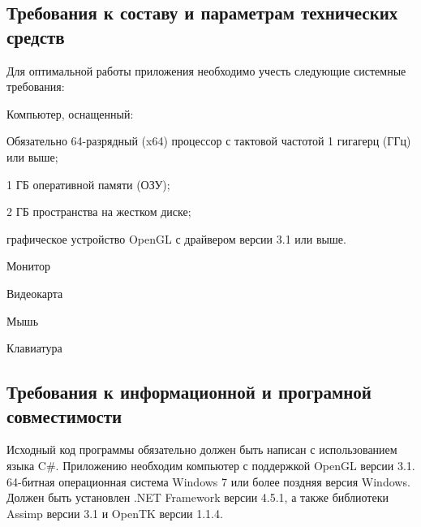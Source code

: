 \subsection{Требования к составу и параметрам технических средств}
Для оптимальной работы приложения необходимо учесть следующие системные требования:
\begin{my_enumerate}
\item Компьютер, оснащенный:
    \begin{my_enumerate}
    \item Обязательно 64-разрядный (x64) процессор с тактовой частотой 1 гигагерц (ГГц) или выше;
    \item 1 ГБ оперативной памяти (ОЗУ);
    \item 2 ГБ пространства на жестком диске;
    \item графическое устройство OpenGL с драйвером версии 3.1 или выше.
    \end{my_enumerate}
\item Монитор
\item Видеокарта
\item Мышь
\item Клавиатура
\end{my_enumerate}


\subsection{Требования к информационной и програмной совместимости}
Исходный код программы обязательно должен быть написан с использованием языка C\#. Приложению необходим компьютер с поддержкой OpenGL версии 3.1. 64-битная операционная система Windows 7 или более поздняя версия Windows. Должен быть установлен .NET Framework версии 4.5.1, а также библиотеки Assimp версии 3.1 и OpenTK версии 1.1.4.

